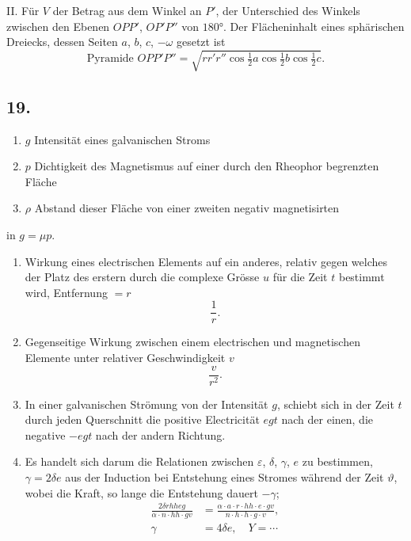\documentclass[fontsize=10pt,paper=a5,pagesize=auto]{scrbook}
\newcommand{\origpage}[1]{\marginpar{\footnotesize\textit{S. #1}}}
\begin{document}
\textsc{II.} Für $V$ der Betrag aus dem Winkel an $P'$, der Unterschied des Winkels zwischen den Ebenen $OPP'$, $OP'P''$ von $180°$. Der Flächeninhalt eines sphärischen Dreiecks, dessen Seiten $a$, $b$, $c$, $-\omega$ gesetzt ist
\[
\text{Pyramide } OPP'P'' = \sqrt{rr'r'' \cos\tfrac{1}{2}a \cos\tfrac{1}{2}b \cos\tfrac{1}{2}c}.
\]

\subsection*{19.}
\origpage{618}
\begin{enumerate}[label=\arabic*.]
\item $g$ Intensität eines galvanischen Stroms
\item $p$ Dichtigkeit des Magnetismus auf einer durch den Rheophor begrenzten Fläche
\item $\rho$ Abstand dieser Fläche von einer zweiten negativ magnetisirten
\end{enumerate}
in $g = \mu p$.

\begin{enumerate}[label=\arabic*.,start=2]
\item Wirkung eines electrischen Elements auf ein anderes, relativ gegen welches der Platz des erstern durch die complexe Grösse $u$ für die Zeit $t$ bestimmt wird, Entfernung $= r$
\[
\frac{1}{r}.
\]

\item Gegenseitige Wirkung zwischen einem electrischen und magnetischen Elemente unter relativer Geschwindigkeit $v$
\[
\frac{v}{r^2}.
\]

\item In einer galvanischen Strömung von der Intensität $g$, schiebt sich in der Zeit $t$ durch jeden Querschnitt die positive Electricität $egt$ nach der einen, die negative $-egt$ nach der andern Richtung.

\item Es handelt sich darum die Relationen zwischen $\varepsilon$, $\delta$, $\gamma$, $e$ zu bestimmen, $\gamma = 2\delta e$ aus der Induction bei Entstehung eines Stromes während der Zeit $\vartheta$, wobei die Kraft, so lange die Entstehung dauert $-\gamma$;
\begin{align*}
\frac{2\delta rhheg}{\alpha \cdot n \cdot hh \cdot gv} &= \frac{\alpha \cdot a \cdot r \cdot hh \cdot e \cdot gv}{n \cdot h \cdot h \cdot g \cdot v},\\
\gamma &= 4\delta e, \quad Y = \cdots
\end{align*}
\end{enumerate}
\end{document}
